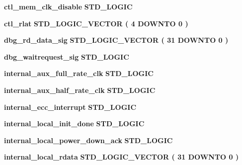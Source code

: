 \begin{DoxyCompactItemize}
{\bf ctl\+\_\+mem\+\_\+clk\+\_\+disable} {\bfseries \textcolor{comment}{S\+T\+D\+\_\+\+L\+O\+G\+IC}\textcolor{vhdlchar}{ }} 
\item 
{\bf ctl\+\_\+rlat} {\bfseries \textcolor{comment}{S\+T\+D\+\_\+\+L\+O\+G\+I\+C\+\_\+\+V\+E\+C\+T\+OR}\textcolor{vhdlchar}{ }\textcolor{vhdlchar}{(}\textcolor{vhdlchar}{ }\textcolor{vhdlchar}{ } \textcolor{vhdldigit}{4} \textcolor{vhdlchar}{ }\textcolor{keywordflow}{D\+O\+W\+N\+TO}\textcolor{vhdlchar}{ }\textcolor{vhdlchar}{ } \textcolor{vhdldigit}{0} \textcolor{vhdlchar}{ }\textcolor{vhdlchar}{)}\textcolor{vhdlchar}{ }} 
\item 
{\bf dbg\+\_\+rd\+\_\+data\+\_\+sig} {\bfseries \textcolor{comment}{S\+T\+D\+\_\+\+L\+O\+G\+I\+C\+\_\+\+V\+E\+C\+T\+OR}\textcolor{vhdlchar}{ }\textcolor{vhdlchar}{(}\textcolor{vhdlchar}{ }\textcolor{vhdlchar}{ } \textcolor{vhdldigit}{31} \textcolor{vhdlchar}{ }\textcolor{keywordflow}{D\+O\+W\+N\+TO}\textcolor{vhdlchar}{ }\textcolor{vhdlchar}{ } \textcolor{vhdldigit}{0} \textcolor{vhdlchar}{ }\textcolor{vhdlchar}{)}\textcolor{vhdlchar}{ }} 
\item 
{\bf dbg\+\_\+waitrequest\+\_\+sig} {\bfseries \textcolor{comment}{S\+T\+D\+\_\+\+L\+O\+G\+IC}\textcolor{vhdlchar}{ }} 
\item 
{\bf internal\+\_\+aux\+\_\+full\+\_\+rate\+\_\+clk} {\bfseries \textcolor{comment}{S\+T\+D\+\_\+\+L\+O\+G\+IC}\textcolor{vhdlchar}{ }} 
\item 
{\bf internal\+\_\+aux\+\_\+half\+\_\+rate\+\_\+clk} {\bfseries \textcolor{comment}{S\+T\+D\+\_\+\+L\+O\+G\+IC}\textcolor{vhdlchar}{ }} 
\item 
{\bf internal\+\_\+ecc\+\_\+interrupt} {\bfseries \textcolor{comment}{S\+T\+D\+\_\+\+L\+O\+G\+IC}\textcolor{vhdlchar}{ }} 
\item 
{\bf internal\+\_\+local\+\_\+init\+\_\+done} {\bfseries \textcolor{comment}{S\+T\+D\+\_\+\+L\+O\+G\+IC}\textcolor{vhdlchar}{ }} 
\item 
{\bf internal\+\_\+local\+\_\+power\+\_\+down\+\_\+ack} {\bfseries \textcolor{comment}{S\+T\+D\+\_\+\+L\+O\+G\+IC}\textcolor{vhdlchar}{ }} 
\item 
{\bf internal\+\_\+local\+\_\+rdata} {\bfseries \textcolor{comment}{S\+T\+D\+\_\+\+L\+O\+G\+I\+C\+\_\+\+V\+E\+C\+T\+OR}\textcolor{vhdlchar}{ }\textcolor{vhdlchar}{(}\textcolor{vhdlchar}{ }\textcolor{vhdlchar}{ } \textcolor{vhdldigit}{31} \textcolor{vhdlchar}{ }\textcolor{keywordflow}{D\+O\+W\+N\+TO}\textcolor{vhdlchar}{ }\textcolor{vhdlchar}{ } \textcolor{vhdldigit}{0} \textcolor{vhdlchar}{ }\textcolor{vhdlchar}{)}\textcolor{vhdlchar}{ }} 

\end{DoxyCompactItemize}
